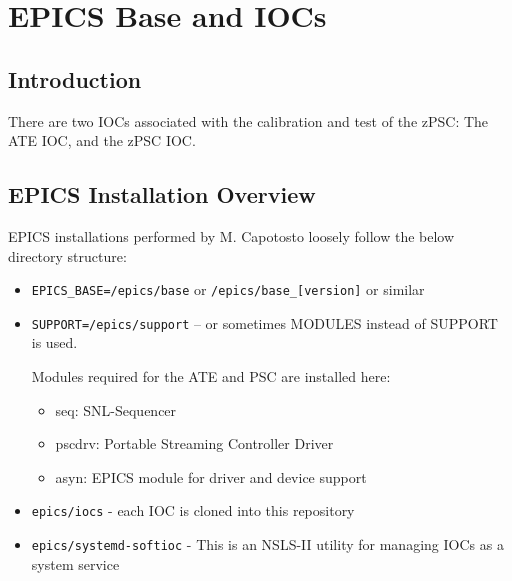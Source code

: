 \chapter{EPICS Base and IOCs}
\label{chap:epics_iocs}

\section{Introduction}
There are two IOCs associated with the calibration and test of the zPSC: The ATE IOC, and the zPSC IOC.

\section{EPICS Installation Overview}
	EPICS installations performed by M. Capotosto loosely follow the below directory structure:

	\begin{itemize}
		\item \texttt{EPICS\_BASE=/epics/base} or \texttt{/epics/base\_[version]} or similar
		\item \texttt{SUPPORT=/epics/support} -- or sometimes MODULES instead of SUPPORT is used.
			\par\bigskip
			\quad Modules required for the ATE and PSC are installed here:
			\begin{itemize}[topsep=0pt]
				\item seq: SNL-Sequencer
				\item pscdrv: Portable Streaming Controller Driver
				\item asyn: EPICS module for driver and device support
			\end{itemize}
		\item \texttt{epics/iocs} - each IOC is cloned into this repository
		\item \texttt{epics/systemd-softioc} - This is an NSLS-II utility for managing IOCs as a system service
	\end{itemize}

